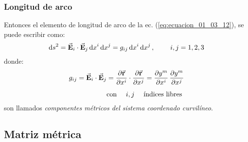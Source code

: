 \documentclass[12pt]{beamer}
\begin{document}
\begin{frame}
\frametitle{Longitud de arco}
Entonces el elemento de longitud de arco de la ec. (\ref{eq:ecuacion_01_03_12}), se puede escribir como:
\pause
\begin{align*}
\dd{s}^{2} = \va{E}_{i} \cdot \va{E}_{j} \dd{x}^{i} \dd{x}^{j} = g_{ij} \dd{x}^{i} \dd{x}^{j}, \hspace{0.8cm} i, j = 1, 2, 3
\end{align*}
\pause
donde:
\pause
\begin{align}
\begin{aligned}
g_{ij} = \va{E}_{i} \cdot \va{E}_{j} &= \pdv{\va{r}}{x^{i}} \cdot \pdv{\va{r}}{x^{j}} = \pdv{y^{m}}{x^{i}} \, \pdv{y^{m}}{x^{j}} \\[0.5em]
&\mbox{con \quad} i, j \quad \mbox{ índices libres}
\end{aligned}
\label{eq:ecuacion_01_03_13}
\end{align}
son llamados \emph{componentes métricos del sistema coordenado curvilíneo}.
\end{frame}

\subsection{Matriz métrica}
\end{document}

